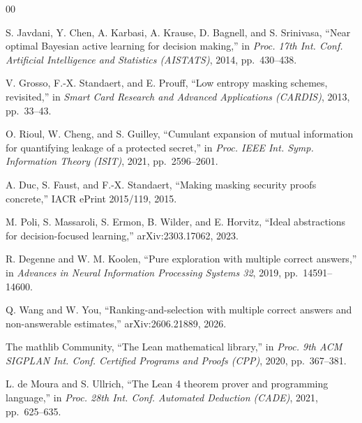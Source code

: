 \begin{thebibliography}{00}

 S. Javdani, Y. Chen, A. Karbasi, A. Krause, D. Bagnell, and
S. Srinivasa, ``Near optimal Bayesian active learning for decision making,'' in
\emph{Proc. 17th Int. Conf. Artificial Intelligence and Statistics (AISTATS)}, 2014,
pp.~430--438.

 V. Grosso, F.-X. Standaert, and E. Prouff, ``Low entropy masking
schemes, revisited,'' in \emph{Smart Card Research and Advanced Applications (CARDIS)},
2013, pp.~33--43.

 O. Rioul, W. Cheng, and S. Guilley, ``Cumulant expansion of mutual
information for quantifying leakage of a protected secret,'' in \emph{Proc. IEEE Int. Symp.
Information Theory (ISIT)}, 2021, pp.~2596--2601.

 A. Duc, S. Faust, and F.-X. Standaert, ``Making masking security
proofs concrete,'' IACR ePrint 2015/119, 2015.

 M. Poli, S. Massaroli, S. Ermon, B. Wilder, and E. Horvitz, ``Ideal
abstractions for decision-focused learning,'' arXiv:2303.17062, 2023.

 R. Degenne and W. M. Koolen, ``Pure exploration with multiple correct
answers,'' in \emph{Advances in Neural Information Processing Systems 32}, 2019,
pp.~14591--14600.

 Q. Wang and W. You, ``Ranking-and-selection with multiple correct
answers and non-answerable estimates,'' arXiv:2606.21889, 2026.

 The mathlib Community, ``The Lean mathematical library,'' in
\emph{Proc. 9th ACM SIGPLAN Int. Conf. Certified Programs and Proofs (CPP)}, 2020,
pp.~367--381.

 L. de Moura and S. Ullrich, ``The Lean 4 theorem prover and
programming language,'' in \emph{Proc. 28th Int. Conf. Automated Deduction (CADE)}, 2021,
pp.~625--635.

\end{thebibliography}


